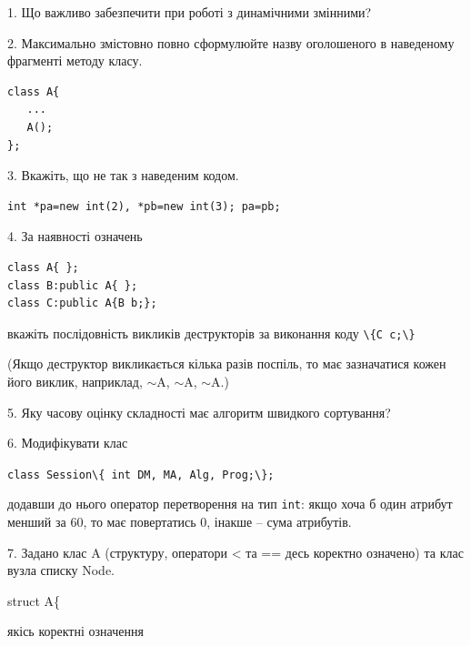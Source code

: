 \documentclass[12pt, ukrainian]{article}
\def\code#1{\Verb!#1!}
\begin{document}
{%
1. Що важливо забезпечити при роботі з динамічними змінними?%
\par
\vspace{2mm}
2. Максимально змістовно повно сформулюйте назву оголошеного в наведеному фрагменті методу класу.
\vspace{-3mm}
\begin{verbatim}class A{
   ...
   A();
};\end{verbatim}
\vspace{-3mm}
\par
\vspace{2mm}
3. Вкажіть, що не так з наведеним кодом.
\vspace{-3mm}
\begin{verbatim}int *pa=new int(2), *pb=new int(3); pa=pb;\end{verbatim}
\vspace{-3mm}
\par
\vspace{2mm}
4. За наявності означень
\vspace{-3mm}
\begin{verbatim}
class A{ };
class B:public A{ };
class C:public A{B b;};\end{verbatim}
\vspace{-3mm}
вкажіть послідовність викликів деструкторів за виконання коду \code{\{C c;\}} 

(Якщо деструктор викликається кілька разів поспіль, то має зазначатися кожен його виклик, наприклад, $\sim$A, $\sim$A, $\sim$A.)

\vspace{2mm}
5. Яку часову оцінку складності має алгоритм швидкого сортування?
\par
\vspace{2mm}
6. Модифікувати клас 

\qquad\code{class Session\{ int DM, MA, Alg, Prog;\};} 


додавши до нього оператор перетворення на тип \code{int}: якщо хоча б один атрибут менший за 60, то має повертатись 0, інакше -- сума атрибутів.%
\par
\vspace{2mm}
7. 
Задано клас A (структуру, оператори < та == десь коректно означено) та клас вузла списку Node.

struct A\{

\quad  якісь коректні означення 

}
\end{document}
